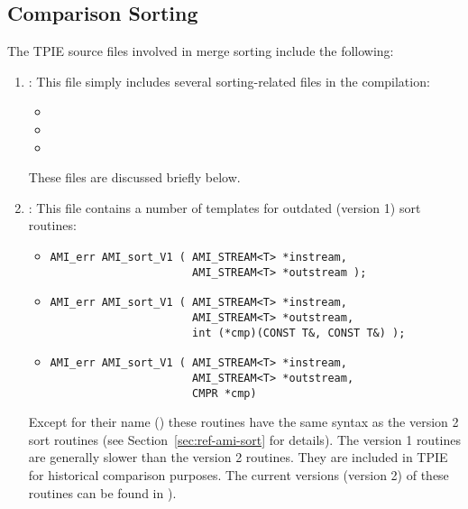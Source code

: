 \subsection{Comparison Sorting}


The TPIE source files involved in merge sorting include the following:

\begin{enumerate}

    \item {}: This file simply
    includes several sorting-related files in the compilation:
    \begin{itemize}
        \item {}
        \item {}
        \item {}
    \end{itemize}
    \noindent
     These files are discussed briefly below.
     
     \item {}: This file
     contains a number of templates for outdated (version 1)
     sort routines:
    \begin{itemize}
        \item 
\begin{verbatim}
AMI_err AMI_sort_V1 ( AMI_STREAM<T> *instream, 
                      AMI_STREAM<T> *outstream ); 
\end{verbatim}
        \item 
\begin{verbatim}
AMI_err AMI_sort_V1 ( AMI_STREAM<T> *instream, 
                      AMI_STREAM<T> *outstream, 
                      int (*cmp)(CONST T&, CONST T&) );
\end{verbatim}

        \item 
\begin{verbatim}
AMI_err AMI_sort_V1 ( AMI_STREAM<T> *instream, 
                      AMI_STREAM<T> *outstream, 
                      CMPR *cmp)
\end{verbatim}
    \end{itemize}
    Except for their name () these
    routines have the same syntax as the version 2 sort
    routines  (see
    Section~\ref{sec:ref-ami-sort} for details). The version
    1 routines are generally slower than the version 2
    routines. They are included in TPIE for historical
    comparison purposes.
    The current versions (version 2) of these routines can
    be found in ).


\end{enumerate}
